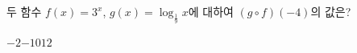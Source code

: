 두 함수 $f(x)=3^x$, $g(x)=\log_{\frac{1}{9}} x$에 대하여 $(g\circ f)(-4)$의 값은?
\begin{choices32}{$-2$}{$-1$}{$0$}{$1$}{$2$}\end{choices32}
